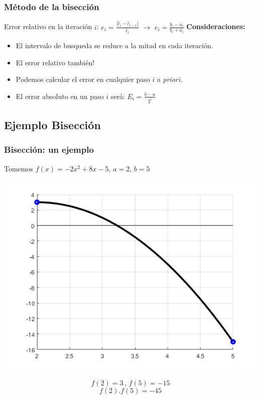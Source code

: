 \documentclass[xcolor=svgnames]{beamer} %
\theoremstyle{plain}
\renewcommand{\textbf}[1]{{\bfseries\textcolor{redUnq2}{#1}}}
\theoremstyle{definition}
\begin{document}
\begin{frame}
\frametitle{Método de la bisección}

Error relativo en la iteración $i$: $e_i = \frac{|\hat c_i-\hat c_{i-1}|}{\hat c_i} $ $\rightarrow$ $\boxed{ e_i= \frac{b_i-a_i}{b_i+a_i}}$\vspace{10pt}
\pause
\textbf{Consideraciones:}
\begin{itemize}
\pause
\item El intervalo de busqueda se reduce a la mitad en cada iteración.
\pause
\item El error relativo también!
\pause
\item Podemos calcular el error en cualquier paso $i$ a \textit{priori}.
\pause
\item El error absoluto en un paso $i$ será: $E_i = \frac{b-a}{2^i}$
\end{itemize}

\end{frame}

\subsection{Ejemplo Bisección}
\begin{frame}
\frametitle{Bisección: un ejemplo}
Tomemos $f(x) = -2x^2+8x-5, \, a=2, \, b=5$
\begin{minipage}{.7\linewidth}
\includegraphics[scale=.5]{Biseccion/f0.png} 
\end{minipage}
\begin{minipage}{.25\linewidth}
$$f(2)=3 \,,\,f(5)=-15$$\vspace{7pt}
$$f(2).f(5) = -45$$\vspace{7pt}

\end{minipage}
\end{frame}
\end{document}
